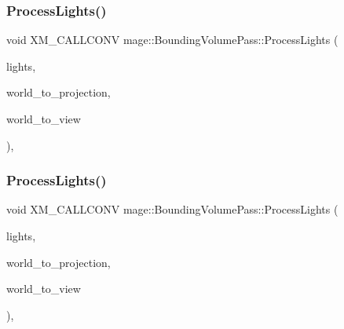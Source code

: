 \subsubsection{\texorpdfstring{Process\+Lights()}{ProcessLights()}\hspace{0.1cm}{\footnotesize\ttfamily [1/2]}}
{\footnotesize\ttfamily void X\+M\+\_\+\+C\+A\+L\+L\+C\+O\+NV mage\+::\+Bounding\+Volume\+Pass\+::\+Process\+Lights (\begin{DoxyParamCaption}\item[{const vector$<$ const \hyperlink{namespacemage_a1724c6e6b6b5ba535cdd967cbbb4a669}{Omni\+Light\+Node} $\ast$ $>$ \&}]{lights,  }\item[{F\+X\+M\+M\+A\+T\+R\+IX}]{world\+\_\+to\+\_\+projection,  }\item[{F\+X\+M\+M\+A\+T\+R\+IX}]{world\+\_\+to\+\_\+view }\end{DoxyParamCaption})\hspace{0.3cm}{\ttfamily [private]}, {\ttfamily [noexcept]}}

\hypertarget{classmage_1_1_bounding_volume_pass_ab403e4703e67be26c07ad9d8fa2586c2}{}\label{classmage_1_1_bounding_volume_pass_ab403e4703e67be26c07ad9d8fa2586c2} 
\subsubsection{\texorpdfstring{Process\+Lights()}{ProcessLights()}\hspace{0.1cm}{\footnotesize\ttfamily [2/2]}}
{\footnotesize\ttfamily void X\+M\+\_\+\+C\+A\+L\+L\+C\+O\+NV mage\+::\+Bounding\+Volume\+Pass\+::\+Process\+Lights (\begin{DoxyParamCaption}\item[{const vector$<$ const \hyperlink{namespacemage_aeed5dee4ff6c591eabb0e9114256df4a}{Spot\+Light\+Node} $\ast$ $>$ \&}]{lights,  }\item[{F\+X\+M\+M\+A\+T\+R\+IX}]{world\+\_\+to\+\_\+projection,  }\item[{F\+X\+M\+M\+A\+T\+R\+IX}]{world\+\_\+to\+\_\+view }\end{DoxyParamCaption})\hspace{0.3cm}{\ttfamily [private]}, {\ttfamily [noexcept]}}

\hypertarget{classmage_1_1_bounding_volume_pass_adb2273b594f0337e129c2bad8d0b8dba}{}\label{classmage_1_1_bounding_volume_pass_adb2273b594f0337e129c2bad8d0b8dba} 
